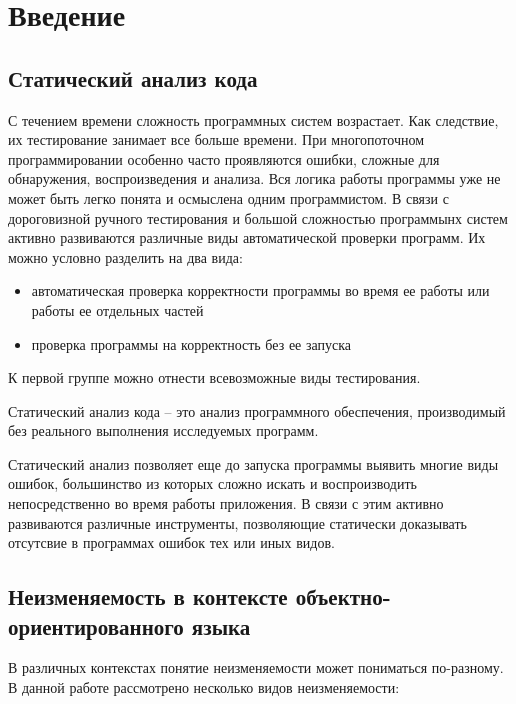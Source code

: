 \chapter{Введение}

\section{Статический анализ кода}

С течением времени сложность программных систем возрастает. Как следствие, их тестирование занимает все больше времени. При многопоточном программировании особенно часто проявляются ошибки, сложные для обнаружения, воспроизведения и анализа. Вся логика работы программы уже не может быть легко понята и осмыслена одним программистом. В связи с дороговизной ручного тестирования и большой сложностью программынх систем активно развиваются различные виды автоматической проверки программ. Их можно условно разделить на два вида:
\begin{itemize}
\item автоматическая проверка корректности программы во время ее работы или работы ее отдельных частей
\item проверка программы на корректность без ее запуска
\end{itemize}

К первой группе можно отнести всевозможные виды тестирования. 

\begin{Def}\label{static_program_analysis}
Статический анализ кода -- это анализ программного обеспечения, производимый без реального выполнения исследуемых программ.
\end{Def}

Статический анализ позволяет еще до запуска программы выявить многие виды ошибок, большинство из которых сложно искать и воспроизводить непосредственно во время работы приложения. В связи с этим активно развиваются различные инструменты, позволяющие статически доказывать отсутсвие в программах ошибок тех или иных видов.  



\section{Неизменяемость в контексте объектно-ори\-ентированного языка}

В различных контекстах понятие неизменяемости может пониматься по-разному. В данной работе рассмотрено несколько видов неизменяемости:


